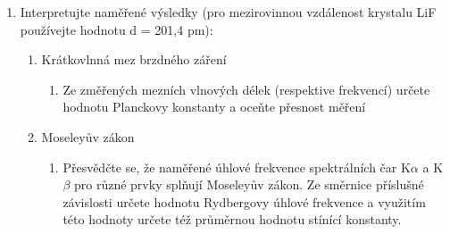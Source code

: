 \begin{enumerate}
\begin{enumerate}
\begin{enumerate}
        \item proměřte tvar spektra s Zr absorbérem. K měření používejte tyto parametry: clonu s Zr absorbérem tloušťky 0,05 mm, interval Braggova úhlu (3° – 30°), krok 0,1° a dobu expozice 3 s.
    \end{enumerate}

\item Rentgenka s Mo anodou.

    \begin{enumerate}
        \item proměřte charakteristické spektrum rentgenky při napětí 33 kV/0.8 mA. K měření používejte tyto parametry: clonu o průměru 2  mm, interval Braggova úhlu (3° – 35°), krok 0,1° a dobu expozice 3 s.
    \end{enumerate}

\item Rentgenka s Cu anodou:

    \begin{enumerate}
        \item proměřte charakteristické spektrum rentgenky při napětí 33 kV/0,8 mA v intervalu Braggova úhlu (42° – 51°). K měření používejte tyto parametry: clonu o průměru 2 mm, krok 0,1° a dobou expozice 2 s.
    \end{enumerate}
    
\end{enumerate}

\item Interpretujte naměřené výsledky (pro mezirovinnou vzdálenost krystalu LiF používejte hodnotu d = 201,4 pm):

\begin{enumerate}
    \item Krátkovlnná mez brzdného záření

    \begin{enumerate}
        \item Ze změřených mezních vlnových délek (respektive frekvencí) určete hodnotu Planckovy konstanty a oceňte přesnost měření
    \end{enumerate}

\item Moseleyův zákon

    \begin{enumerate}
        \item Přesvědčte se, že naměřené úhlové frekvence spektrálních čar K$\alpha$ a K$\beta$ pro různé prvky splňují Moseleyův zákon. Ze směrnice příslušné závislosti určete hodnotu Rydbergovy úhlové frekvence a využitím této hodnoty určete též průměrnou hodnotu stínící konstanty.


\end{enumerate}
\end{enumerate}
\end{enumerate}
